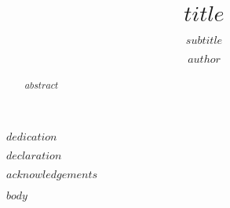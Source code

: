 \documentclass[a4paper,12pt,times,numbered,print,index]{templates/PhDThesisPSnPDF}
\title{$title$}
\subtitle{$subtitle$}
\author{$author$}
\begin{document}
\frontmatter

\maketitle

\begin{dedication}
  $dedication$
\end{dedication}

\begin{declaration}
  $declaration$
\end{declaration}

\begin{acknowledgements}
  $acknowledgements$
\end{acknowledgements}

\begin{abstract}
  $abstract$
\end{abstract}


\tableofcontents

\listoffigures

\listoftables


\printnomenclature


$body$

%
%
%
%
%
%



\backmatter

\begin{spacing}{0.9}



\cleardoublepage
\renewcommand{\bibname}{$bibliography-heading$}





\end{spacing}
\end{document}
